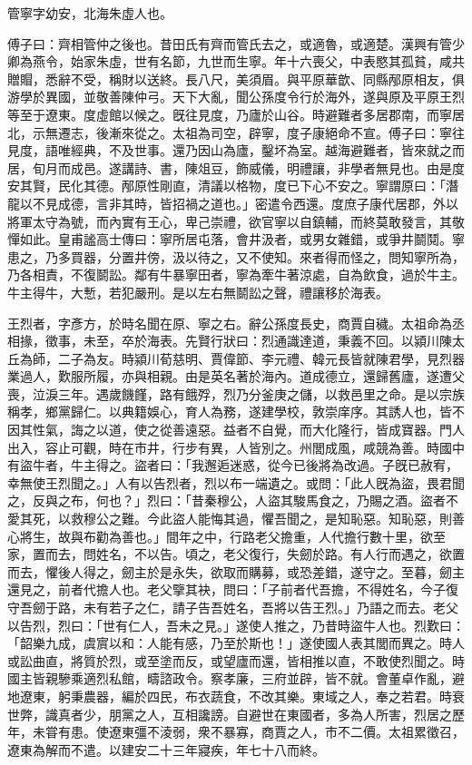 
\begin{pinyinscope}
管寧字幼安，北海朱虛人也。

傅子曰：齊相管仲之後也。昔田氏有齊而管氏去之，或適魯，或適楚。漢興有管少卿為燕令，始家朱虛，世有名節，九世而生寧。年十六喪父，中表愍其孤貧，咸共贈賵，悉辭不受，稱財以送終。長八尺，美須眉。與平原華歆、同縣邴原相友，俱游學於異國，並敬善陳仲弓。天下大亂，聞公孫度令行於海外，遂與原及平原王烈等至于遼東。度虛館以候之。旣往見度，乃廬於山谷。時避難者多居郡南，而寧居北，示無遷志，後漸來從之。太祖為司空，辟寧，度子康絕命不宣。傅子曰：寧往見度，語唯經典，不及世事。還乃因山為廬，鑿坏為室。越海避難者，皆來就之而居，旬月而成邑。遂講詩、書，陳俎豆，飾威儀，明禮讓，非學者無見也。由是度安其賢，民化其德。邴原性剛直，清議以格物，度已下心不安之。寧謂原曰：「潛龍以不見成德，言非其時，皆招禍之道也。」密遣令西還。度庶子康代居郡，外以將軍太守為號，而內實有王心，卑己崇禮，欲官寧以自鎮輔，而終莫敢發言，其敬憚如此。皇甫謐高士傳曰：寧所居屯落，會井汲者，或男女雜錯，或爭井鬬鬩。寧患之，乃多買器，分置井傍，汲以待之，又不使知。來者得而怪之，問知寧所為，乃各相責，不復鬬訟。鄰有牛暴寧田者，寧為牽牛著涼處，自為飲食，過於牛主。牛主得牛，大慙，若犯嚴刑。是以左右無鬬訟之聲，禮讓移於海表。

王烈者，字彥方，於時名聞在原、寧之右。辭公孫度長史，商賈自穢。太祖命為丞相掾，徵事，未至，卒於海表。先賢行狀曰：烈通識達道，秉義不回。以潁川陳太丘為師，二子為友。時潁川荀慈明、賈偉節、李元禮、韓元長皆就陳君學，見烈器業過人，歎服所履，亦與相親。由是英名著於海內。道成德立，還歸舊廬，遂遭父喪，泣淚三年。遇歲饑饉，路有餓殍，烈乃分釜庚之儲，以救邑里之命。是以宗族稱孝，鄉黨歸仁。以典籍娛心，育人為務，遂建學校，敦崇庠序。其誘人也，皆不因其性氣，誨之以道，使之從善遠惡。益者不自覺，而大化隆行，皆成寶器。門人出入，容止可觀，時在市井，行步有異，人皆別之。州閭成風，咸競為善。時國中有盜牛者，牛主得之。盜者曰：「我邂逅迷惑，從今已後將為改過。子旣已赦宥，幸無使王烈聞之。」人有以告烈者，烈以布一端遺之。或問：「此人旣為盜，畏君聞之，反與之布，何也？」烈曰：「昔秦穆公，人盜其駿馬食之，乃賜之酒。盜者不愛其死，以救穆公之難。今此盜人能悔其過，懼吾聞之，是知恥惡。知恥惡，則善心將生，故與布勸為善也。」間年之中，行路老父擔重，人代擔行數十里，欲至家，置而去，問姓名，不以告。頃之，老父復行，失劒於路。有人行而遇之，欲置而去，懼後人得之，劒主於是永失，欲取而購募，或恐差錯，遂守之。至暮，劒主還見之，前者代擔人也。老父擥其袂，問曰：「子前者代吾擔，不得姓名，今子復守吾劒于路，未有若子之仁，請子告吾姓名，吾將以告王烈。」乃語之而去。老父以告烈，烈曰：「世有仁人，吾未之見。」遂使人推之，乃昔時盜牛人也。烈歎曰：「韶樂九成，虞賔以和：人能有感，乃至於斯也！」遂使國人表其閭而異之。時人或訟曲直，將質於烈，或至塗而反，或望廬而還，皆相推以直，不敢使烈聞之。時國主皆親驂乘適烈私館，疇諮政令。察孝廉，三府並辟，皆不就。會董卓作亂，避地遼東，躬秉農器，編於四民，布衣蔬食，不改其樂。東域之人，奉之若君。時衰世弊，識真者少，朋黨之人，互相讒謗。自避世在東國者，多為人所害，烈居之歷年，未甞有患。使遼東彊不淩弱，衆不暴寡，商賈之人，市不二價。太祖累徵召，遼東為解而不遣。以建安二十三年寢疾，年七十八而終。


\end{pinyinscope}
